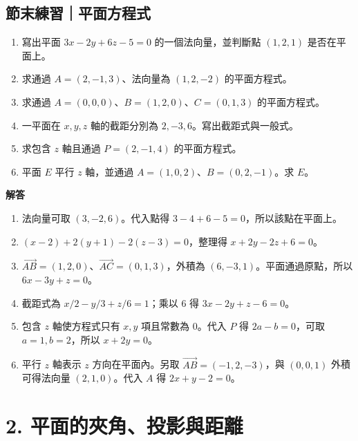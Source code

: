 \documentclass[11pt,a4paper]{article}
\providecommand{\tightlist}{%
  \setlength{\itemsep}{0pt}\setlength{\parskip}{0pt}}
\begin{document}
\begin{HandoutSelfCheck}

\subsection{節末練習｜平面方程式}\label{ux7bc0ux672bux7df4ux7fd2ux5e73ux9762ux65b9ux7a0bux5f0f}

\begin{enumerate}
\def\labelenumi{\arabic{enumi}.}
\tightlist
\item
  寫出平面 \(3x-2y+6z-5=0\) 的一個法向量，並判斷點 \((1,2,1)\) 是否在平面上。
\item
  求通過 \(A=(2,-1,3)\)、法向量為 \((1,2,-2)\) 的平面方程式。
\item
  求通過 \(A=(0,0,0)\)、\(B=(1,2,0)\)、\(C=(0,1,3)\) 的平面方程式。
\item
  一平面在 \(x,y,z\) 軸的截距分別為 \(2,-3,6\)。寫出截距式與一般式。
\item
  求包含 \(z\) 軸且通過 \(P=(2,-1,4)\) 的平面方程式。
\item
  平面 \(E\) 平行 \(z\) 軸，並通過 \(A=(1,0,2)\)、\(B=(0,2,-1)\)。求 \(E\)。
\end{enumerate}

\textbf{解答}

\begin{enumerate}
\def\labelenumi{\arabic{enumi}.}
\tightlist
\item
  法向量可取 \((3,-2,6)\)。代入點得 \(3-4+6-5=0\)，所以該點在平面上。
\item
  \((x-2)+2(y+1)-2(z-3)=0\)，整理得 \(\boxed{x+2y-2z+6=0}\)。
\item
  \(\overrightarrow{AB}=(1,2,0)\)、\(\overrightarrow{AC}=(0,1,3)\)，外積為 \((6,-3,1)\)。平面通過原點，所以 \(\boxed{6x-3y+z=0}\)。
\item
  截距式為 \(x/2-y/3+z/6=1\)；乘以 \(6\) 得 \(\boxed{3x-2y+z-6=0}\)。
\item
  包含 \(z\) 軸使方程式只有 \(x,y\) 項且常數為 \(0\)。代入 \(P\) 得 \(2a-b=0\)，可取 \(a=1,b=2\)，所以 \(\boxed{x+2y=0}\)。
\item
  平行 \(z\) 軸表示 \(z\) 方向在平面內。另取 \(\overrightarrow{AB}=(-1,2,-3)\)，與 \((0,0,1)\) 外積可得法向量 \((2,1,0)\)。代入 \(A\) 得 \(\boxed{2x+y-2=0}\)。
\end{enumerate}

\end{HandoutSelfCheck}

\section{2. 平面的夾角、投影與距離}\label{ux5e73ux9762ux7684ux593eux89d2ux6295ux5f71ux8207ux8dddux96e2}
\end{document}
